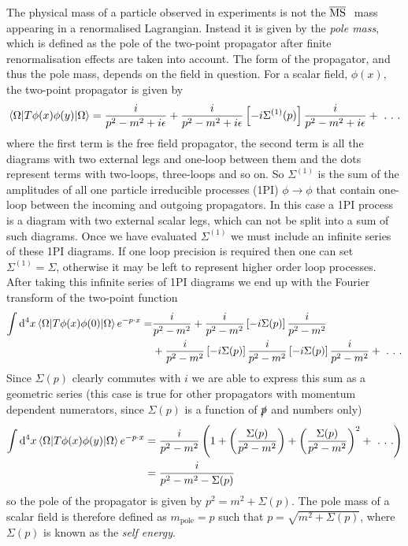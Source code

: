 \documentclass[11pt]{article}
\renewcommand{\d}{\ensuremath{\operatorname{d}\!}}
\begin{document}
The physical mass of a particle observed in experiments is not the \mbox{\footnotesize$\overline{\rm MS}~$} mass appearing in a renormalised Lagrangian.  Instead it is given by the \textit{pole mass}, which is defined as the pole of the two-point propagator after finite renormalisation effects are taken into account.  The form of the propagator, and thus the pole mass, depends on the field in question.  For a scalar field, $\phi(x)$, the two-point propagator is given by
\begin{align}
\braket{\Omega |T\phi(x)\phi(y) | \Omega} = \frac{i}{p^2-m^2+i\epsilon} + \frac{i}{p^2-m^2+i\epsilon}\left[-i\Sigma^{(1)}(p)\right]\frac{i}{p^2-m^2+i\epsilon}+ \ . \ . \ . \label{eqn:scalar_two_point}
\end{align}
where the first term is the free field propagator, the second term is all the diagrams with two external legs and one-loop between them and the dots represent terms with two-loops, three-loops and so on.  So $\Sigma^{(1)}$ is the sum of the amplitudes of all one particle irreducible processes (1PI) $\phi\rightarrow\phi$ that contain one-loop between the incoming and outgoing propagators.  In this case a 1PI process is a diagram with two external scalar legs, which can not be split into a sum of such diagrams.  Once we have evaluated $\Sigma^{(1)}$ we must include an infinite series of these 1PI diagrams.  If one loop precision is required then one can set $\Sigma^{(1)}=\Sigma$, otherwise it may be left to represent higher order loop processes.  After taking this infinite series of 1PI diagrams we end up with the Fourier transform of the two-point function
\begin{align}
\begin{split}
\int \d^4x\braket{\Omega |T\phi(x)\phi(0) | \Omega} e^{-p\cdot x}=& \frac{i}{p^2-m^2} + \frac{i}{p^2-m^2}\left[-i\Sigma(p)\right]\frac{i}{p^2-m^2} \\
& + \frac{i}{p^2-m^2}\left[-i\Sigma(p)\right]\frac{i}{p^2-m^2}\left[-i\Sigma(p)\right]\frac{i}{p^2-m^2}+ \ . \ . \ . 
\end{split}
\end{align}
Since $\Sigma(p)$ clearly commutes with $i$ we are able to express this sum as a geometric series (this case is true for other propagators with momentum dependent numerators, since $\Sigma(p)$ is a function of $\slashed{p}$ and numbers only)
\begin{align}
\begin{split}
\int \d^4x\braket{\Omega |T\phi(x)\phi(y) | \Omega} e^{-p\cdot x}&=\frac{i}{p^2-m^2}\left(1 +\left(\frac{\Sigma(p)}{p^2-m^2}\right)+\left(\frac{\Sigma(p)}{p^2-m^2}\right)^2+\ . \ . \ .\right)\\
&=\frac{i}{p^2-m^2-\Sigma(p)}
\end{split}
\end{align}
so the pole of the propagator is given by $p^2 = m^2+\Sigma(p)$.  The pole mass of a scalar field is therefore defined as $m_{\text{pole}}=p$ such that $p=\sqrt{m^2+\Sigma(p)}$, where $\Sigma(p)$ is known as the \textit{self energy}.\\
\end{document}
